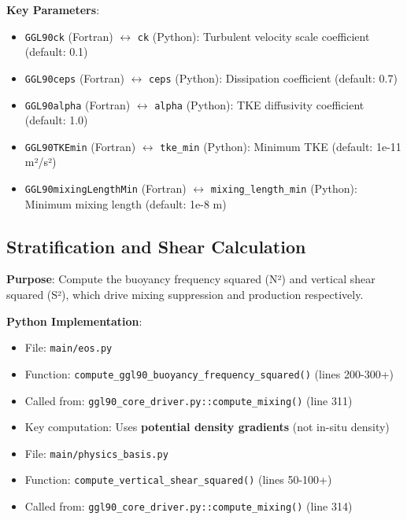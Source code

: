 \documentclass[11pt]{article}
\begin{document}
\textbf{Key Parameters}:
\begin{itemize}
    \item \verb|GGL90ck| (Fortran) $\leftrightarrow$ \verb|ck| (Python): Turbulent velocity scale coefficient (default: 0.1)
    \item \verb|GGL90ceps| (Fortran) $\leftrightarrow$ \verb|ceps| (Python): Dissipation coefficient (default: 0.7)
    \item \verb|GGL90alpha| (Fortran) $\leftrightarrow$ \verb|alpha| (Python): TKE diffusivity coefficient (default: 1.0)
    \item \verb|GGL90TKEmin| (Fortran) $\leftrightarrow$ \verb|tke_min| (Python): Minimum TKE (default: 1e-11 m²/s²)
    \item \verb|GGL90mixingLengthMin| (Fortran) $\leftrightarrow$ \verb|mixing_length_min| (Python): Minimum mixing length (default: 1e-8 m)
\end{itemize}

\subsection{Stratification and Shear Calculation}

\textbf{Purpose}: Compute the buoyancy frequency squared (N²) and vertical shear squared (S²), which drive mixing suppression and production respectively.

\textbf{Python Implementation}:
\begin{itemize}
    \item File: \verb|main/eos.py|
    \item Function: \verb|compute_ggl90_buoyancy_frequency_squared()| (lines 200-300+)
    \item Called from: \verb|ggl90_core_driver.py::compute_mixing()| (line 311)
    \item Key computation: Uses \textbf{potential density gradients} (not in-situ density)
    \item File: \verb|main/physics_basis.py|
    \item Function: \verb|compute_vertical_shear_squared()| (lines 50-100+)
    \item Called from: \verb|ggl90_core_driver.py::compute_mixing()| (line 314)
\end{itemize}
\end{document}
